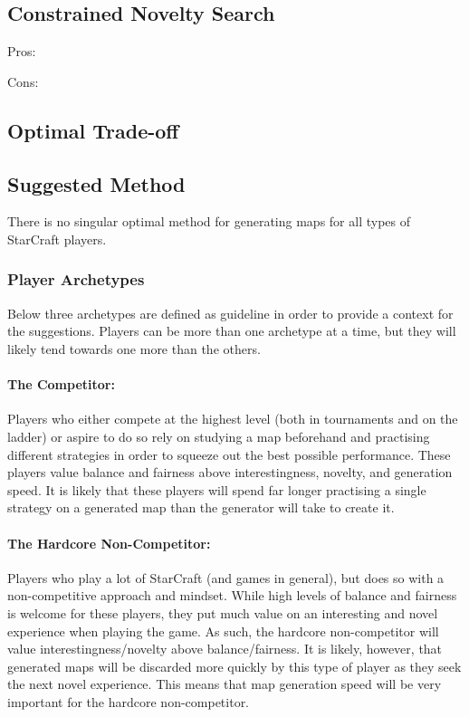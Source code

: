 \subsection{Constrained Novelty Search}
\label{discussion_comparison_constrainednoveltysearch}
Pros:
\begin{my_itemize}
\item
\item
\end{my_itemize}
Cons:
\begin{my_itemize}
\item
\item
\end{my_itemize}

\subsection{Optimal Trade-off}

\subsection{Suggested Method}
There is no singular optimal method for generating maps for all types of StarCraft players. 

\subsubsection{Player Archetypes}
Below three archetypes are defined as guideline in order to provide a context for the suggestions. Players can be more than one archetype at a time, but they will likely tend towards one more than the others.

\paragraph{The Competitor:} Players who either compete at the highest level (both in tournaments and on the ladder) or aspire to do so rely on studying a map beforehand and practising different strategies in order to squeeze out the best possible performance. These players value balance and fairness above interestingness, novelty, and generation speed. It is likely that these players will spend far longer practising a single strategy on a generated map than the generator will take to create it.

\paragraph{The Hardcore Non-Competitor:} Players who play a lot of StarCraft (and games in general), but does so with a non-competitive approach and mindset. While high levels of balance and fairness is welcome for these players, they put much value on an interesting and novel experience when playing the game. As such, the hardcore non-competitor will value interestingness/novelty above balance/fairness. It is likely, however, that generated maps will be discarded more quickly by this type of player as they seek the next novel experience. This means that map generation speed will be very important for the hardcore non-competitor.

